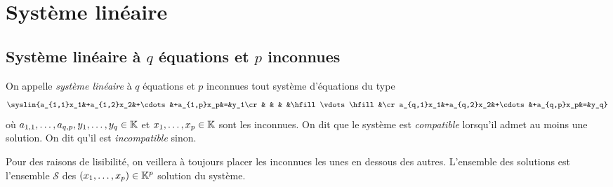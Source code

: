 \documentclass{magnoliaold}
\begin{document}
\section{Système linéaire}


\subsection{Système linéaire à $q$ équations et $p$ inconnues}

\begin{definition}[utile=-3]
On appelle \emph{système linéaire} à $q$ équations et $p$ inconnues tout système
d'équations du type
\[\syslin{a_{1,1}x_1&+a_{1,2}x_2&+\cdots&+a_{1,p}x_p&=&y_1\cr
                   &          &       &          &\hfill\vdots\hfill&\cr
          a_{q,1}x_1&+a_{q,2}x_2&+\cdots&+a_{q,p}x_p&=&y_q}\]
où $a_{1,1},\ldots,a_{q,p},y_1,\ldots,y_q\in\mathbb{K}$ et $x_1,\ldots,x_p\in\mathbb{K}$ sont
les inconnues. On dit que le système est \emph{compatible} lorsqu'il admet au moins une
solution. On dit qu'il est \emph{incompatible} sinon.
\end{definition}

\begin{remarques}
\remarque Pour des raisons de lisibilité, on veillera à toujours placer les inconnues
  les unes en dessous des autres.
\remarque L'ensemble des solutions est l'ensemble $\mathcal{S}$ des
  $(x_1,\ldots,x_p)\in\mathbb{K}^p$ solution du système.
\end{remarques}

\end{document}
